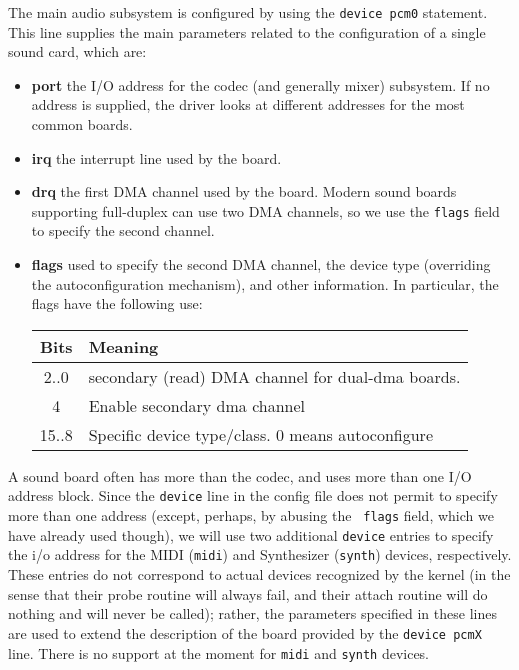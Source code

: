 \documentclass[11pt]{article}
\begin{document}
The main audio subsystem is configured by using the {\tt device
pcm0} statement. This line supplies the main parameters related to the
configuration of a single sound card, which are:
\begin{itemize}
\item {\bf port} the I/O address for the codec (and generally mixer)
    subsystem. If no address is supplied, the driver looks at
    different addresses for the most common boards.
\item {\bf irq} the interrupt line used by the board.
\item {\bf drq} the first DMA channel used by the board. Modern
    sound boards supporting full-duplex can use two DMA channels,
    so we use the {\tt flags} field to specify the second channel.
\item {\bf flags} used to specify the second DMA channel, the device
    type (overriding the autoconfiguration mechanism), and
    other information.
    In particular, the flags have the following use:\\
    \begin{center}
    \begin{tabular}{|c|l|}
    \hline Bits & Meaning \\
    \hline \hline
    2..0 & secondary (read) DMA channel for dual-dma boards. \\
    \hline
    4    & Enable secondary dma channel \\
    \hline
    15..8 & Specific device type/class. 0 means autoconfigure\\
    \hline
    \end{tabular}
    \end{center}
\end{itemize}
A sound board often has more than the codec, and uses more than one
I/O address block. Since the {\tt device} line in the config file
does not permit to
specify more than one address (except, perhaps, by abusing the {\tt
flags} field, which we have already used though), we will
use two additional {\tt device} entries to specify the i/o address
for the MIDI ({\tt midi}) and Synthesizer ({\tt synth}) devices,
respectively. These entries do not correspond to actual devices
recognized by the kernel (in the sense that their probe routine will
always fail, and their attach routine will do nothing and will never
be called); rather, the parameters specified in these lines are used
to extend the description of the board provided by the {\tt device
pcmX} line.
There is no support at the moment for {\tt midi} and {\tt synth}
devices.
\end{document}
